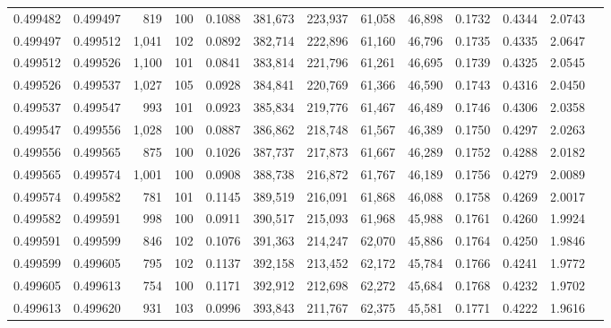 \begin{tabular}{rrrrrrrrrrrrr}
0.499482 & 0.499497 &   819 & 100 &                                     0.1088 & 381,673 & 223,937 &  61,058 &  46,898 & 0.1732 & 0.4344 & 2.0743 \\
0.499497 & 0.499512 & 1,041 & 102 &                                     0.0892 & 382,714 & 222,896 &  61,160 &  46,796 & 0.1735 & 0.4335 & 2.0647 \\
0.499512 & 0.499526 & 1,100 & 101 &                                     0.0841 & 383,814 & 221,796 &  61,261 &  46,695 & 0.1739 & 0.4325 & 2.0545 \\
0.499526 & 0.499537 & 1,027 & 105 &                                     0.0928 & 384,841 & 220,769 &  61,366 &  46,590 & 0.1743 & 0.4316 & 2.0450 \\
0.499537 & 0.499547 &   993 & 101 &                                     0.0923 & 385,834 & 219,776 &  61,467 &  46,489 & 0.1746 & 0.4306 & 2.0358 \\
0.499547 & 0.499556 & 1,028 & 100 &                                     0.0887 & 386,862 & 218,748 &  61,567 &  46,389 & 0.1750 & 0.4297 & 2.0263 \\
0.499556 & 0.499565 &   875 & 100 &                                     0.1026 & 387,737 & 217,873 &  61,667 &  46,289 & 0.1752 & 0.4288 & 2.0182 \\
0.499565 & 0.499574 & 1,001 & 100 &                                     0.0908 & 388,738 & 216,872 &  61,767 &  46,189 & 0.1756 & 0.4279 & 2.0089 \\
0.499574 & 0.499582 &   781 & 101 &                                     0.1145 & 389,519 & 216,091 &  61,868 &  46,088 & 0.1758 & 0.4269 & 2.0017 \\
0.499582 & 0.499591 &   998 & 100 &                                     0.0911 & 390,517 & 215,093 &  61,968 &  45,988 & 0.1761 & 0.4260 & 1.9924 \\
0.499591 & 0.499599 &   846 & 102 &                                     0.1076 & 391,363 & 214,247 &  62,070 &  45,886 & 0.1764 & 0.4250 & 1.9846 \\
0.499599 & 0.499605 &   795 & 102 &                                     0.1137 & 392,158 & 213,452 &  62,172 &  45,784 & 0.1766 & 0.4241 & 1.9772 \\
0.499605 & 0.499613 &   754 & 100 &                                     0.1171 & 392,912 & 212,698 &  62,272 &  45,684 & 0.1768 & 0.4232 & 1.9702 \\
0.499613 & 0.499620 &   931 & 103 &                                     0.0996 & 393,843 & 211,767 &  62,375 &  45,581 & 0.1771 & 0.4222 & 1.9616 \\

\end{tabular}
